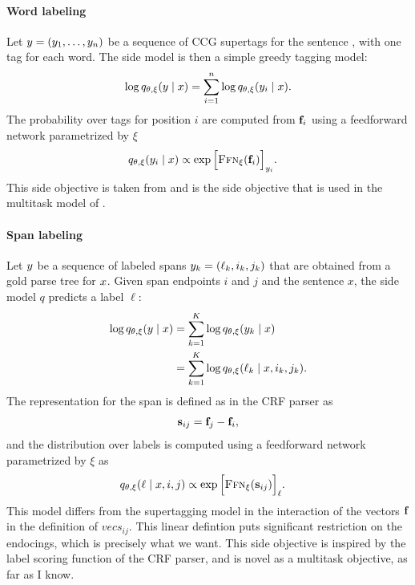 \paragraph{Word labeling}
Let $y = ( y_1, \dots, y_n )$ be a sequence of CCG supertags for the sentence \x, with one tag for each word. The side model is then a simple greedy tagging model:
\begin{align*}
  \log q_{\theta, \xi}(y \mid x)
    &= \sum_{i=1}^n \log q_{\theta, \xi}( y_i \mid x).  \\
\end{align*}
The probability over tags for position $i$ are computed from $\mathbf{f}_i$ using a feedforward network parametrized by $\xi$
\begin{align*}
  q_{\theta, \xi}( y_i \mid x) &\propto \exp \Big[ \textsc{Ffn}_{\xi}( \mathbf{f}_{i} ) \Big]_{y_i}.
\end{align*}
This side objective is taken from \citet{enguehard2017multitask} and is the side objective that is used in the multitask model of \citet{linzen2018targeted}.

\paragraph{Span labeling}
Let $y$ be a sequence of labeled spans $y_k = (\ell_k, i_k, j_k)$ that are obtained from a gold parse tree for $x$. Given span endpoints $i$ and $j$ and the sentence $x$, the side model $q$ predicts a label $\ell$:
\begin{align*}
  \log q_{\theta, \xi}(y \mid x)
    &= \sum_{k=1}^K \log q_{\theta, \xi}( y_k \mid x)  \\
    &= \sum_{k=1}^K \log q_{\theta, \xi}( \ell_k \mid x, i_k, j_k).
\end{align*}
The representation for the span is defined as in the CRF parser as
\begin{align*}
  \mathbf{s}_{ij} = \mathbf{f}_j - \mathbf{f}_i,
\end{align*}
and the distribution over labels is computed using a feedforward network parametrized by $\xi$ as
\begin{align*}
  q_{\theta, \xi}( \ell \mid x, i, j) &\propto \exp \Big[ \textsc{Ffn}_{\xi}( \mathbf{s}_{ij} ) \Big]_{\ell}.
\end{align*}
This model differs from the supertagging model in the interaction of the vectors $\mathbf{f}$ in the definition of $vecs_{ij}$. This linear defintion puts significant restriction on the endocings, which is precisely what we want. This side objective is inspired by the label scoring function of the CRF parser, and is novel as a multitask objective, as far as I know.

